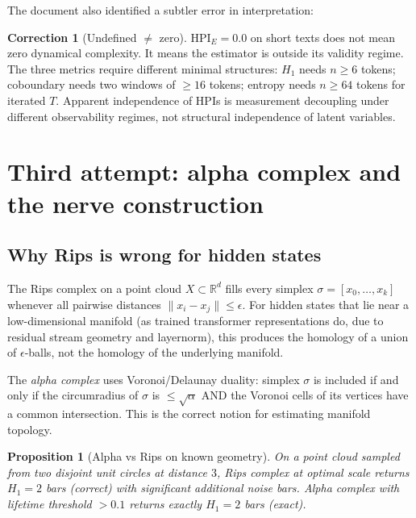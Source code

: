 \documentclass[11pt]{amsart}
\newtheorem{proposition}[theorem]{Proposition}
\theoremstyle{definition}
\newtheorem{correction}[theorem]{Correction}
\begin{document}
The document also identified a subtler error in interpretation:

\begin{correction}[Undefined $\neq$ zero]
$\mathrm{HPI}_E = 0.0$ on short texts does not mean zero dynamical complexity.
It means the estimator is outside its validity regime.
The three metrics require different minimal structures:
$H_1$ needs $n \geq 6$ tokens; coboundary needs two windows of $\geq 16$ tokens;
entropy needs $n \geq 64$ tokens for iterated $T$.
Apparent independence of HPIs is measurement decoupling under different
observability regimes, not structural independence of latent variables.
\end{correction}

\section{Third attempt: alpha complex and the nerve construction}
\label{sec:alpha}

\subsection{Why Rips is wrong for hidden states}

The Rips complex on a point cloud $X \subset \mathbb{R}^d$ fills every simplex
$\sigma = [x_0, \ldots, x_k]$ whenever all pairwise distances $\|x_i - x_j\| \leq \epsilon$.
For hidden states that lie near a low-dimensional manifold (as trained
transformer representations do, due to residual stream geometry and layernorm),
this produces the homology of a union of $\epsilon$-balls, not the homology
of the underlying manifold.

The \emph{alpha complex} uses Voronoi/Delaunay duality:
simplex $\sigma$ is included if and only if the circumradius of $\sigma$
is $\leq \sqrt{\alpha}$ AND the Voronoi cells of its vertices have a common
intersection.
This is the correct notion for estimating manifold topology.

\begin{proposition}[Alpha vs Rips on known geometry]
On a point cloud sampled from two disjoint unit circles at distance $3$,
Rips complex at optimal scale returns $H_1 = 2$ bars (correct) with
significant additional noise bars.
Alpha complex with lifetime threshold $> 0.1$ returns exactly $H_1 = 2$ bars (exact).
\end{proposition}
\end{document}
